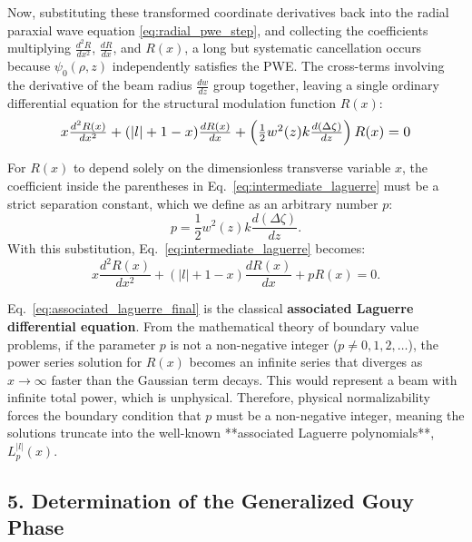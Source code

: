 \begin{resolucao}[Solution]
        Now, substituting these transformed coordinate derivatives back into the radial paraxial wave equation \eqref{eq:radial_pwe_step}, and collecting the coefficients multiplying $\frac{d^2 R}{dx^2}$, $\frac{dR}{dx}$, and $R(x)$, a long but systematic cancellation occurs because $\psi_0(\rho, z)$ independently satisfies the PWE. The cross-terms involving the derivative of the beam radius $\frac{dw}{dz}$ group together, leaving a single ordinary differential equation for the structural modulation function $R(x)$:
        \begin{equation}
            \resizebox{0.8\columnwidth}{!}{$
                x \frac{d^2 R(x)}{dx^2}
                + (|l| + 1 - x) \frac{dR(x)}{dx}
                + \left( \frac{1}{2} w^2(z) k \frac{d(\Delta\zeta)}{dz} \right) R(x)
                = 0
            $}
            \label{eq:intermediate_laguerre}
        \end{equation}
        
        For $R(x)$ to depend solely on the dimensionless transverse variable $x$, the coefficient inside the parentheses in Eq.~\eqref{eq:intermediate_laguerre} must be a strict separation constant, which we define as an arbitrary number $p$:
        \begin{equation}
            p = \frac{1}{2} w^2(z) k \frac{d(\Delta\zeta)}{dz}.
            \label{eq:separation_p}
        \end{equation}
        With this substitution, Eq.~\eqref{eq:intermediate_laguerre} becomes:
        \begin{equation}
            x \frac{d^2 R(x)}{dx^2} + (|l| + 1 - x) \frac{dR(x)}{dx} + p R(x) = 0.
            \label{eq:associated_laguerre_final}
        \end{equation}
        
        Eq.~\eqref{eq:associated_laguerre_final} is the classical \textbf{associated Laguerre differential equation}. From the mathematical theory of boundary value problems, if the parameter $p$ is not a non-negative integer ($p \neq 0, 1, 2, \dots$), the power series solution for $R(x)$ becomes an infinite series that diverges as $x \to \infty$ faster than the Gaussian term decays. This would represent a beam with infinite total power, which is unphysical. Therefore, physical normalizability forces the boundary condition that $p$ must be a non-negative integer, meaning the solutions truncate into the well-known **associated Laguerre polynomials**, $L_p^{|l|}(x)$.

    \subsection*{5. Determination of the Generalized Gouy Phase}


\end{resolucao}
